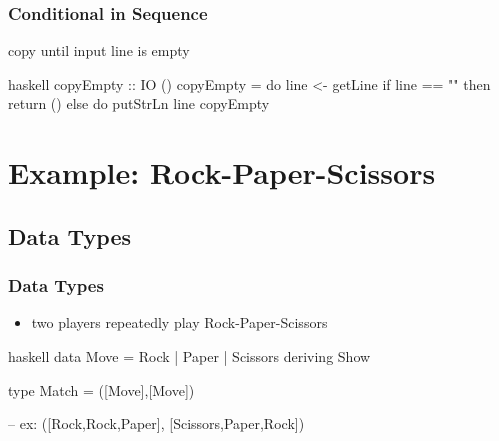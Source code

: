 \documentclass[dvipsnames]{beamer}
\theoremstyle{plain}
\begin{document}
\begin{frame}[fragile]
  \frametitle{Conditional in Sequence}

  \begin{exampleblock}{copy until input line is empty}
    \begin{pygments}{haskell}
copyEmpty :: IO ()
copyEmpty = do line <- getLine
               if line == ""
                   then return ()
                   else do putStrLn line
                           copyEmpty
    \end{pygments}
  \end{exampleblock}
\end{frame}

\section{Example: Rock-Paper-Scissors}

\subsection{Data Types}

\begin{frame}[fragile]
  \frametitle{Data Types}

  \begin{itemize}
    \item two players repeatedly play Rock-Paper-Scissors
  \end{itemize}

  \begin{exampleblock}{}
    \begin{pygments}{haskell}
data Move = Rock | Paper | Scissors
            deriving Show

type Match = ([Move],[Move])

-- ex: ([Rock,Rock,Paper], [Scissors,Paper,Rock])
    \end{pygments}
  \end{exampleblock}
\end{frame}
\end{document}
